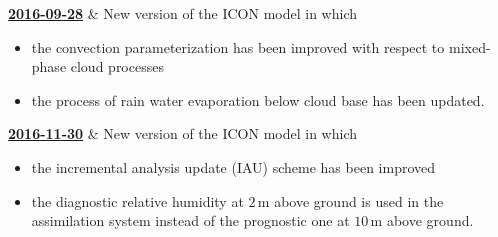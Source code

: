 \begin{vtimeline}[description={text width=0.78\textwidth}, 
 row sep=3ex, 
 add bottom line,
 line offset=10pt,
 timeline color=colorBlue,
 timeline color2=colorRed]
  \href{http://www.dwd.de/DE/fachnutzer/forschung_lehre/numerische_wettervorhersage/nwv_aenderungen/_functions/DownloadBox_modellaenderungen/icon/pdf_2016/pdf_icon_28_09_2016.pdf?__blob=publicationFile&v=3}
         {\textbf{2016-09-28}} & New version of the ICON model in which 
                      \small
                      \begin{itemize}
                       \item the convection parameterization has been improved with respect to mixed-phase cloud processes
                       \item the process of rain water evaporation below cloud base has been updated. 
                      \end{itemize}
                      \endlr        
{}  \href{http://www.dwd.de/DE/fachnutzer/forschung_lehre/numerische_wettervorhersage/nwv_aenderungen/_functions/DownloadBox_modellaenderungen/icon/pdf_2016/pdf_icon_30_11_2016.pdf?__blob=publicationFile&v=2}
         {\textbf{2016-11-30}} & New version of the ICON model in which 
                      \small
                      \begin{itemize}
                       \item the incremental analysis update (IAU) scheme has been improved
                       \item the diagnostic relative humidity at $2\,\mathrm{m}$ above ground is used in the assimilation system instead of the prognostic one at $10\,\mathrm{m}$ above ground.  
                      \end{itemize}
                      \endlr        
\end{vtimeline}